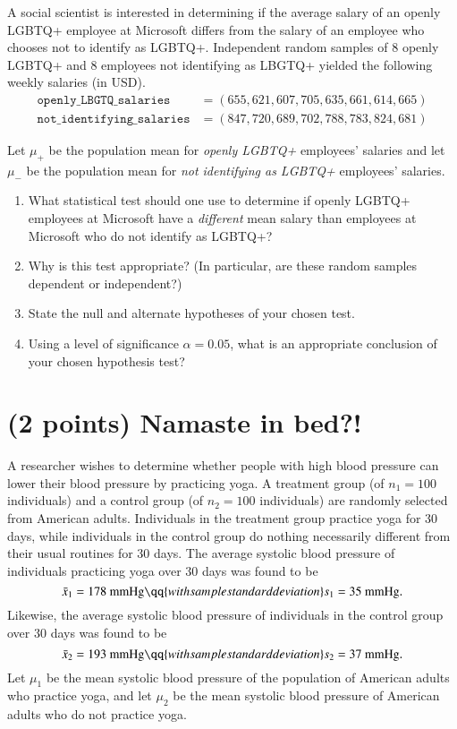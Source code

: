 \documentclass{ccg-topic}
\begin{document}
A social scientist is interested in determining if the average salary of an openly LGBTQ+ employee at Microsoft differs from the salary of an employee who chooses not to identify as LGBTQ+. Independent random samples of 8 openly LGBTQ+ and 8 employees not identifying as LBGTQ+ yielded the following weekly salaries (in USD). 
\begin{align*}
    \texttt{openly\_LBGTQ\_salaries} &= (655, 621, 607, 705, 635, 661, 614, 665)\\
    \texttt{not\_identifying\_salaries} &= (847, 720, 689, 702, 788, 783, 824, 681)
\end{align*}

Let $\mu_+$ be the population mean for \emph{openly LGBTQ+} employees' salaries and let $\mu_-$ be the population mean for \emph{not identifying as LGBTQ+} employees' salaries. 

\begin{enumerate}
\item What statistical test should one use to determine if openly LGBTQ+ employees at Microsoft have a \emph{different} mean salary than employees at Microsoft who do not identify as LGBTQ+?

\vfill

\item Why is this test appropriate? (In particular, are these random samples dependent or independent?)

\vfill

\item State the null and alternate hypotheses of your chosen test.

\vfill

\item Using a level of significance $\alpha = 0.05$, what is an appropriate conclusion of your chosen hypothesis test? 

\vfill

\end{enumerate}

\section*{(2 points) Namaste in bed?!}

 A researcher wishes to determine whether people with high blood pressure can lower their blood pressure by practicing yoga. A treatment group (of $n_1 = 100$ individuals) and a control group (of $n_2 = 100$ individuals) are randomly selected from American adults. Individuals in the treatment group practice yoga for 30 days, while individuals in the control group do nothing necessarily different from their usual routines for 30 days. The average systolic blood pressure of individuals practicing yoga over $30$ days was found to be $$\bar{x}_1 = 178 \text{ mmHg} \qq{with sample standard deviation} s_1 = 35 \text{ mmHg}.$$ Likewise, the average systolic blood pressure of individuals in the control group over $30$ days was found to be $$\bar{x}_2 = 193 \text{ mmHg} \qq{with sample standard deviation} s_2 = 37 \text{ mmHg}.$$
Let $\mu_1$ be the mean systolic blood pressure of the population of American adults who practice yoga, and let $\mu_2$ be the mean systolic blood pressure of American adults who do not practice yoga. 
\end{document}
